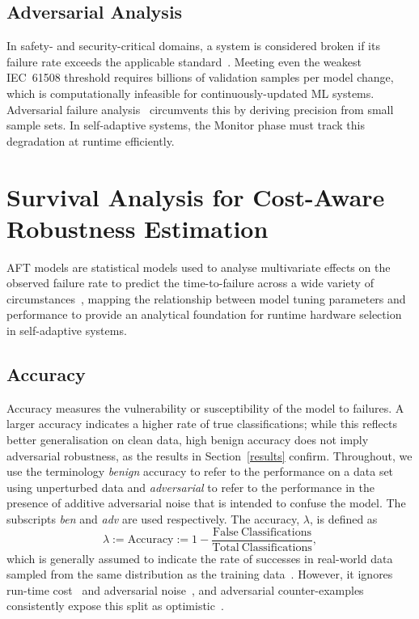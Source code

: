 \documentclass[conference]{IEEEtran}%
\begin{document}
\subsection{Adversarial Analysis}
In safety- and security-critical domains, a system is considered broken if its failure rate exceeds the applicable standard~\cite{IEC61508,sajid2013cloud}. 
Meeting even the weakest IEC~61508 threshold requires billions of validation samples per model change, which is computationally infeasible for continuously-updated ML systems. 
Adversarial failure analysis~\cite{carlini_towards_2017,biggio_evasion_2013,meyers} circumvents this by deriving precision from small sample sets. 
In self-adaptive systems, the Monitor phase must track this degradation at runtime efficiently.


\section{Survival Analysis for Cost-Aware Robustness Estimation}
\label{aft}

AFT models are statistical models used to analyse multivariate effects on the observed failure rate to predict the time-to-failure across a wide variety of circumstances~\cite{aft_models,kleinbaum1996survival}, mapping the relationship between model tuning parameters and performance to provide an analytical foundation for runtime hardware selection in self-adaptive systems.

\subsection{Accuracy}
\label{acc}

Accuracy measures the vulnerability or susceptibility of the model to failures. 
A larger accuracy indicates a higher rate of true classifications; while this reflects better generalisation on clean data, high benign accuracy does not imply adversarial robustness, as the results in Section~\ref{results} confirm. 
Throughout, we use the terminology \textit{benign} accuracy to refer to the performance on a data set using unperturbed data and \textit{adversarial} to refer to the performance in the presence of additive adversarial noise that is intended to confuse the model. 
The subscripts \textit{ben} and \textit{adv} are used respectively. 
The accuracy, $\lambda$, is defined as
\begin{equation}
    \lambda:= \mathrm{Accuracy} := 1 - \frac{\mathrm{False~Classifications}}{\mathrm{Total~Classifications}},
    \label{eq:acc}
\end{equation}
which is generally assumed to indicate the rate of successes in real-world data sampled from the same distribution as the training data~\cite{tan2021critical}. 
However, it ignores run-time cost~\cite{desislavov2021compute,bailly2022effects} and adversarial noise~\cite{croce_reliable_2020}, and adversarial counter-examples consistently expose this split as optimistic~\cite{carlini_towards_2017,adversarialpatch,pixelattack,biggio_poisoning_2013,meyers}.
\end{document}
